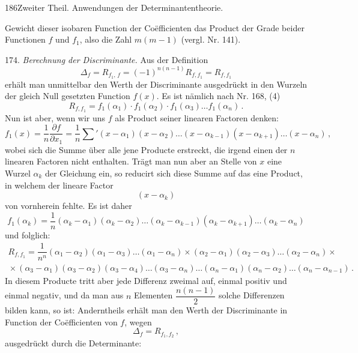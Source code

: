 186\quad Zweiter Theil. Anwendungen der Determinantentheorie.

Gewicht dieser isobaren Function der Co\"efficienten das Product der
Grade beider Functionen $f$ und $f_1$, also die Zahl $m(m-1)$ (vergl.
Nr. 141).

174. \textit{Berechnung der Discriminante.} Aus der Definition
\[
\Delta_f = R_{f_1,\,f} = (-1)^{n(n-1)}R_{f,f_1} = R_{f,f_1}
\]
erhält man unmittelbar den Werth der Discriminante ausgedrückt in
den Wurzeln der gleich Null gesetzten Function $f(x)$. Es ist nämlich
nach Nr. 168, (4)
\[
R_{f,f_1} = f_1(\alpha_1)\cdot f_1(\alpha_2)\cdot f_1(\alpha_3)\ldots f_1(\alpha_n)\,.
\]
Nun ist aber, wenn wir uns $f$ als Product seiner linearen Factoren
denken:
\[
f_1(x) = \frac{1}{n}\frac{\partial f}{\partial x_1}
= \frac{1}{n}\sum{}'(x-\alpha_1)(x-\alpha_2)\ldots(x-\alpha_{k-1})(x-\alpha_{k+1})\ldots(x-\alpha_n)\,,
\]
wobei sich die Summe über alle jene Producte erstreckt, die irgend
einen der $n$ linearen Factoren nicht enthalten. Trägt man nun aber
an Stelle von $x$ eine Wurzel $\alpha_k$ der Gleichung ein, so reducirt sich
diese Summe auf das eine Product, in welchem der lineare Factor
\[
(x - \alpha_k)
\]
von vornherein fehlte. Es ist daher
\[
f_1(\alpha_k) = \frac{1}{n}(\alpha_k-\alpha_1)(\alpha_k-\alpha_2)\ldots(\alpha_k-\alpha_{k-1})(\alpha_k-\alpha_{k+1})\ldots(\alpha_k-\alpha_n)
\]
und folglich:
\[
\begin{gathered}
R_{f,f_1} = \dfrac{1}{n^n}(\alpha_1-\alpha_2)(\alpha_1-\alpha_3)\ldots(\alpha_1-\alpha_n)\times(\alpha_2-\alpha_1)(\alpha_2-\alpha_3)\ldots(\alpha_2-\alpha_n)\times{}\\
{}\times(\alpha_3-\alpha_1)(\alpha_3-\alpha_2)(\alpha_3-\alpha_4)\ldots(\alpha_3-\alpha_n)\ldots(\alpha_n-\alpha_1)(\alpha_n-\alpha_2)\ldots(\alpha_n-\alpha_{n-1})\,.
\end{gathered}
\]
In diesem Producte tritt aber jede Differenz zweimal auf, einmal
positiv und einmal negativ, und da man aus $n$ Elementen $\dfrac{n(n-1)}{2}$
solche Differenzen bilden kann, so ist:
Anderntheils erhält man den Werth der Discriminante in Function
der Co\"efficienten von $f$, wegen
\[
\Delta_f = R_{f_1,f_2}\,,
\]
ausgedrückt durch die Determinante:


